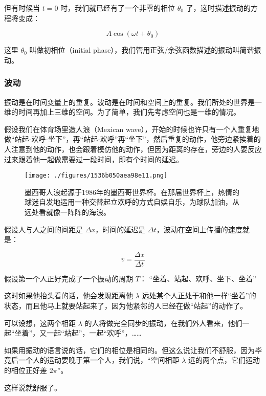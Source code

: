 但有时候当 $t = 0$ 时，我们就已经有了一个非零的相位 $\theta_0$ 了，这时描述振动的方程将变成：

\begin{equation}
A \cos (\omega t + \theta_0)
\end{equation}

这里 $\theta_0$ 叫做初相位（initial phase），我们管用正弦/余弦函数描述的振动叫简谐振动。


\subsubsection{波动}

振动是在时间变量上的重复。波动是在时间和空间上的重复。我们所处的世界是一维的时间再加上三维的空间。为了简单，我们先考虑空间也是一维的情况。

假设我们在体育场里造人浪（Mexican wave），开始的时候也许只有一个人重复地做“站起-欢呼-坐下”，再“站起-欢呼”再“坐下”，然后重复的动作，他旁边紧挨着的人注意到他的动作，也会跟着模仿他的动作，但因为距离的存在，旁边的人要反应过来跟着他一起做需要过一段时间，即有个时间的延迟。

\begin{figure}[ht]
\centering
\texttt{[image: ./figures/1536b050aea98e11.png]}
\caption{墨西哥人浪起源于1986年的墨西哥世界杯。在那届世界杯上，热情的球迷自发地运用一种交替起立欢呼的方式自娱自乐，为球队加油，从远处看就像一阵阵的海浪。} \label{fig_AtomId_8}
\end{figure}


假设人与人之间的间距是 $\Delta x$，时间的延迟是 $\Delta t$，波动在空间上传播的速度就是：

\begin{equation}
v = \frac{\Delta x }{\Delta t}
\end{equation}

假设第一个人正好完成了一个振动的周期 $T$： “坐着、站起、欢呼、坐下、坐着”

这时如果他抬头看的话，他会发现距离他 $\lambda$ 远处某个人正处于和他一样“坐着”的状态，而且他马上就要站起来了，因为他紧邻的人已经在做“站起”的动作了。

可以设想，这两个相距 $\lambda$ 的人将做完全同步的振动，在我们外人看来，他们一起“坐着”，又一起“站起”，一起“欢呼”，……

如果用振动的语言说的话，它们的相位是相同的。但这么说让我们不舒服，因为毕竟后一个人的运动要晚于第一个人，我们说，“空间相距 $\lambda$ 远的两个点，它们运动的相位正好差 $2 \pi$”。


这样说就舒服了。

